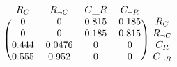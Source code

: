   \[
\begin{blockarray}{ccccc}
R_C & R_{\neg{C}}  & C\_R & C_{\neg{R}} \\
\begin{block}{(cccc)c}
  0         & 0      & 0.815  & 0.185  & R_C   \\
  0         & 0      & 0.185  & 0.815  & R_{\neg{C}} \\
  0.444     & 0.0476 & 0      & 0      & C_R  \\
  0.555     & 0.952  & 0      & 0      & C_{\neg{R}} \\
\end{block}
\end{blockarray}
 \]
